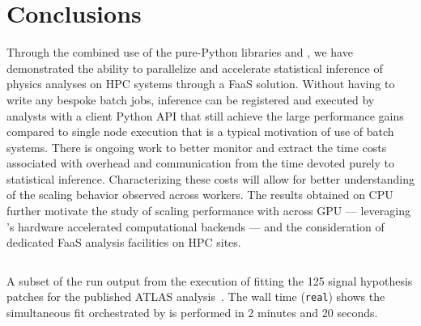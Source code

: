 \section{Conclusions}\label{sec:conclusions}

Through the combined use of the pure-Python libraries \funcX{} and \pyhf{}, we have demonstrated the ability to parallelize and accelerate statistical inference of physics analyses on HPC systems through a FaaS solution.
Without having to write any bespoke batch jobs, inference can be registered and executed by analysts with a client Python API that still achieve the large performance gains compared to single node execution that is a typical motivation of use of batch systems.
There is ongoing work to better monitor and extract the time costs associated with overhead and communication from the time devoted purely to statistical inference.
Characterizing these costs will allow for better understanding of the scaling behavior observed across workers.
The results obtained on CPU further motivate the study of scaling performance with \funcX{} across GPU --- leveraging \pyhf{}'s hardware accelerated computational backends --- and the consideration of dedicated FaaS analysis facilities on HPC sites.

\clearpage
\begin{listing}
 \inputminted{text}{src/code/funcX_demo_output.txt}
 \caption{A subset of the run output from the execution of fitting the 125 signal hypothesis patches for the published ATLAS analysis~\cite{SUSY-2019-08}.
 The wall time (\texttt{real}) shows the simultaneous fit orchestrated by \funcX{} is performed in 2 minutes and 20 seconds.}
 \label{lst:funcX_demo_output}
\end{listing}
